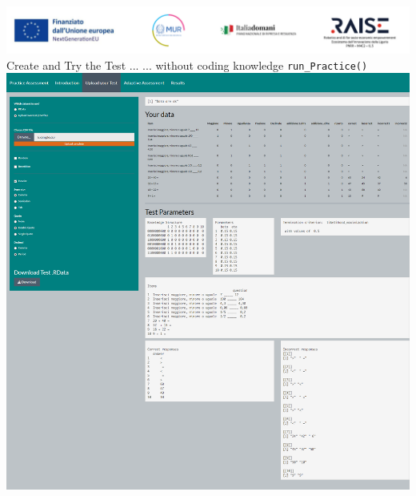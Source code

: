 \documentclass{beamer}
\begin{document}
\begin{frame}{\includegraphics[scale=0.4]{Da_cambiare.png} \\ 
Create and Try the Test ... }{... without coding 
 knowledge \texttt{run\_Practice()}}
{ \includegraphics[scale=0.16]{Loadtest2.png}}
\end{frame}
\end{document}
